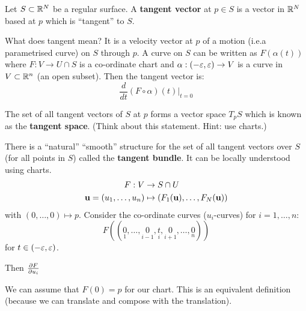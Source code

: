 \begin{defn}[informal]
  Let $S \subset \mathbb{R}^N$ be a regular surface.
  A \textbf{tangent vector} at $p \in S$ is a vector in $\mathbb{R}^N$ based at $p$ which is ``tangent'' to $S$.

  What does tangent mean?
  It is a velocity vector at $p$ of a motion (i.e.\@ a parametrised curve) on $S$ through $p$.
  A curve on $S$ can be written as $F(\alpha(t))$ where $F: V \to U \cap S$ is a co-ordinate chart and $\alpha: (-\varepsilon,\varepsilon) \to V$ is a curve in $V \subset \mathbb{R}^n$ (an open subset).
  Then the tangent vector is:
  \[ \frac{d}{dt} \left( F \circ \alpha \right) (t) \Big|_{t=0} \]

  The set of all tangent vectors of $S$ at $p$ forms a vector space $T_pS$ which is known as the \textbf{tangent space}.
  (Think about this statement.
  Hint: use charts.)

  There is a ``natural'' ``smooth'' structure for the set of all tangent vectors over $S$ (for all points in $S$) called the \textbf{tangent bundle}.
  It can be locally understood using charts.
  \begin{align*}
    F: V &\to S \cap U \\
    \mathbf{u} = (u_1,\ldots,u_n) &\mapsto \left( F_1(\mathbf{u}),\ldots,F_N(\mathbf{u}) \right)
  \end{align*}
  with $(0,\ldots,0) \mapsto p$.
  Consider the co-ordinate curves ($u_i$-curves) for $i=1,\ldots,n$:
  \[ F\left( 
      ( \underset{1}{0}, \ldots, \underset{i-1}{0}, \underset{i}{t}, \underset{i+1}{0}, \ldots, \underset{n}{0} )
    \right)
  \]
  for $t \in (-\varepsilon,\varepsilon)$.
  
  Then $\frac{\partial F}{\partial u_i}$
\end{defn}

\begin{rmk}
  We can assume that $F(0)=p$ for our chart.
  This is an equivalent definition (because we can translate and compose with the translation).
\end{rmk}
